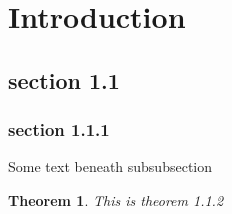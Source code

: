 \documentclass[12 pt]{amsart}
\newtheorem{thm}[subsubsection]{Theorem}
\begin{document}
\section{Introduction}

\subsection{section 1.1}

\subsubsection{section 1.1.1}
Some text beneath subsubsection
\begin{thm}
This is theorem 1.1.2
\end{thm}
\end{document}
